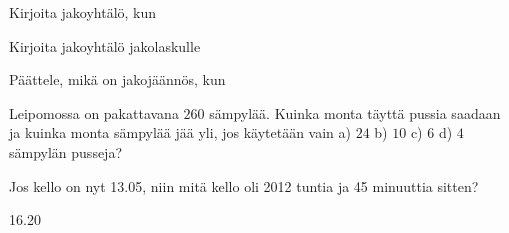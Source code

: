 \begin{tehtavasivu}
\begin{tehtava}
    Kirjoita jakoyhtälö, kun
    
    \begin{vastaus}
    \end{vastaus}
\end{tehtava}

\begin{tehtava}
    Kirjoita jakoyhtälö jakolaskulle
    
    \begin{vastaus}
    \end{vastaus}
\end{tehtava}

\begin{tehtava}
    Päättele, mikä on jakojäännös, kun
    
    \begin{vastaus}
    \end{vastaus}
\end{tehtava}

\begin{tehtava}
    Leipomossa on pakattavana $260$ sämpylää. Kuinka monta täyttä pussia saadaan ja kuinka monta sämpylää jää yli, jos käytetään vain a) $24$ b) $10$ c) $6$ d) $4$ sämpylän pusseja?
    \begin{vastaus}
    \end{vastaus}

\end{tehtava}

\begin{tehtava}
    Jos kello on nyt 13.05, niin mitä kello oli 2012 tuntia ja 45 minuuttia sitten?
    \begin{vastaus}
         16.20
    \end{vastaus}
\end{tehtava}


\end{tehtavasivu}
